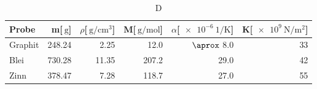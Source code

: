 
\begin{table}[!h]
\begin{center}
\begin{tabular}{|l|r|r|r|r|r|}
\hline
Probe & m[$\SI{}{\gram}$] & $\rho$[$\SI{}{\gram\per\centi\meter^3}$] & M[$\SI{}{\gram\per\mol}$] & $\alpha$[$\SI{e-6}{1\per\kelvin}$] & K[$\SI{e9}{\newton\per\meter^2}$]\\
\hline
\hline
Graphit	& 248.24 & 2.25  & 12.0  & $\aprox$ 8.0  & 33\\
Blei	& 730.28 & 11.35 & 207.2 & 29.0 & 42\\
Zinn	& 378.47 & 7.28  & 118.7 & 27.0 & 55\\
\hline
\end{tabular}
\caption[]{D}
\label{massen}
\end{center}
\end{table}